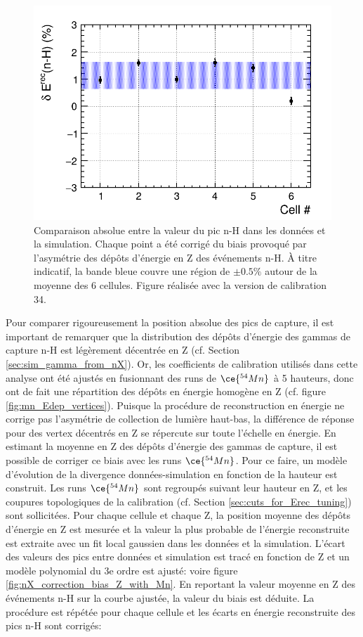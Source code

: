 {\begin{figure}[h!]
\end{figure}

\begin{figure}[h!]
  \centering
  \includegraphics[width=0.75\linewidth]{images/DataMC_diff_Mn_nH_v34.png}
  \caption[Comparaison absolue entre la valeur du pic n-H dans les données et la simulation]{Comparaison absolue entre la valeur du pic n-H dans les données et la simulation. Chaque point a été corrigé du biais provoqué par l'asymétrie des dépôts d'énergie en Z des événements n-H. À titre indicatif, la bande bleue couvre une région de $\pm 0.5 \%$ autour de la moyenne des 6 cellules. Figure réalisée avec la version de calibration 34.}
  \label{fig:DataMC_diff_Mn_nH_v34.png}
\end{figure}

}

Pour comparer rigoureusement la position absolue des pics de capture, il est important de remarquer que la distribution des dépôts d'énergie des gammas de capture n-H est légèrement décentrée en Z (cf. Section \ref{sec:sim_gamma_from_nX}). Or, les coefficients de calibration utilisés dans cette analyse ont été ajustés en fusionnant des runs de $\ce{^{54}Mn}$ à 5 hauteurs, donc ont de fait une répartition des dépôts en énergie homogène en Z (cf. figure \ref{fig:mn_Edep_vertices}). Puisque la procédure de reconstruction en énergie ne corrige pas l'asymétrie de collection de lumière haut-bas, la différence de réponse pour des vertex décentrés en Z se répercute sur toute l'échelle en énergie. En estimant la moyenne en Z des dépôts d'énergie des gammas de capture, il est possible de corriger ce biais avec les runs $\ce{^{54}Mn}$. Pour ce faire, un modèle d'évolution de la divergence données-simulation en fonction de la hauteur est construit. Les runs $\ce{^{54}Mn}$ sont regroupés suivant leur hauteur en Z, et les coupures topologiques de la calibration (cf. Section \ref{sec:cuts_for_Erec_tuning}) sont sollicitées. Pour chaque cellule et chaque Z, la position moyenne des dépôts d'énergie en Z est mesurée et la valeur la plus probable de l'énergie reconstruite est extraite avec un fit local gaussien dans les données et la simulation. L'écart des valeurs des pics entre données et simulation est tracé en fonction de Z et un modèle polynomial du 3e ordre est ajusté: voire figure \ref{fig:nX_correction_bias_Z_with_Mn}. En reportant la valeur moyenne en Z des événements n-H sur la courbe ajustée, la valeur du biais est déduite. La procédure est répétée pour chaque cellule et les écarts en énergie reconstruite des pics n-H sont corrigés:

